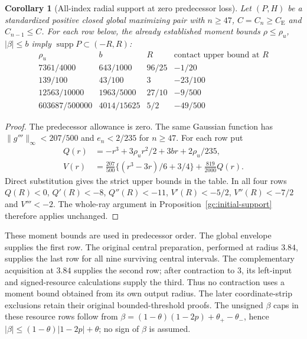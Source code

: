 \documentclass[aop,preprint]{imsart}
\newtheorem{corollary}[theorem]{Corollary}
\theoremstyle{definition}
\newcommand{\CE}{C_{\mathrm E}}
\numberwithin{equation}{section}
\begin{document}
\begin{corollary}[All-index radial support at zero predecessor loss]\label{gc:tail-support}
Let $(P,H)$ be a standardized positive closed global maximizing pair
with $n\ge47$, $C=C_n\ge\CE$ and $C_{n-1}\le C$.
For each row below, the already established moment bounds
$\rho\le\rho_u$, $|\beta|\le b$ imply
$\operatorname{supp}P\subset(-R,R)$:
\[
\begin{array}{c|c|c|c}
 \rho_u&b&R&\text{contact upper bound at }R\\\hline
 7361/4000&643/1000&96/25&-1/20\\
 139/100&43/100&3&-23/100\\
 12563/10000&1963/5000&27/10&-9/500\\
 603687/500000&4014/15625&5/2&-49/500
\end{array}
\]
\end{corollary}
\begin{proof}
The predecessor allowance is zero. The same Gaussian function has
$\|g'''\|_\infty<207/500$ and $e_n<2/235$ for $n\ge47$.
For each row put
\begin{align*}
 Q(r)&=-r^3+3\rho_ur^2/2+3br+2\rho_u/235,\\
 V(r)&=\frac{207}{500}\{(r^3-3r)/6+3/4\}
       +\frac{819}{2000}Q(r).
\end{align*}
Direct substitution gives the strict upper bounds in the table.
In all four rows $Q(R)<0$, $Q'(R)<-8$, $Q''(R)<-11$,
$V'(R)<-5/2$, $V''(R)<-7/2$ and $V'''<-2$.
The whole-ray argument in Proposition~\ref{gc:initial-support}
therefore applies unchanged.
\end{proof}

These moment bounds are used in predecessor order. The global envelope
supplies the first row. The original central preparation, performed
at radius $3.84$, supplies the last row for all nine surviving central
intervals. The complementary acquisition at $3.84$ supplies the second
row; after contraction to $3$, its left-input and signed-resource
calculations supply the third. Thus no contraction uses a moment
bound obtained from its own output radius. The later coordinate-strip
exclusions retain their original bounded-threshold proofs.
The unsigned $\beta$ caps in these resource rows follow from
$\beta=(1-\theta)(1-2p)+\theta_+-\theta_-$, hence
$|\beta|\le(1-\theta)|1-2p|+\theta$; no sign of $\beta$ is assumed.
\end{document}
